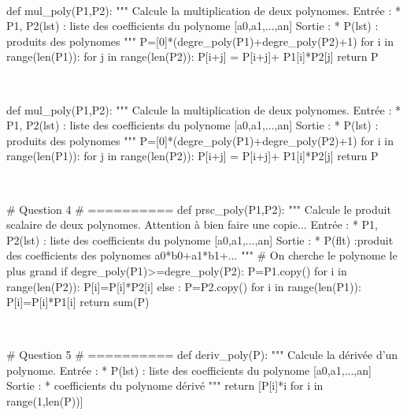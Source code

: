 \documentclass[10pt,fleqn]{article} %
\begin{document}
\begin{multicols}{2}
\newpage

\begin{corrige}
$\quad$
\begin{python}
def mul_poly(P1,P2):
    """
    Calcule la multiplication de deux polynomes.
    Entrée : 
     * P1, P2(lst) : liste des coefficients du 
       polynome [a0,a1,...,an]
    Sortie : 
     * P(lst) : produits des polynomes
    """
    P=[0]*(degre_poly(P1)+degre_poly(P2)+1)
    for i in range(len(P1)):
        for j in range(len(P2)):
           P[i+j] = P[i+j]+ P1[i]*P2[j]
    return P
\end{python}
\end{corrige}

\begin{corrige}
$\quad$
\begin{python}
def mul_poly(P1,P2):
    """
    Calcule la multiplication de deux polynomes.
    Entrée : 
     * P1, P2(lst) : liste des coefficients du 
        polynome [a0,a1,...,an]
    Sortie : 
     * P(lst) : produits des polynomes
    """
    P=[0]*(degre_poly(P1)+degre_poly(P2)+1)
    for i in range(len(P1)):
        for j in range(len(P2)):
           P[i+j] = P[i+j]+ P1[i]*P2[j]
    return P
\end{python}
\end{corrige}



\begin{corrige}
$\quad$
\begin{python}
# Question 4
# ==========
def prsc_poly(P1,P2):
    """
    Calcule le produit scalaire de deux polynomes.
    Attention à bien faire une copie...
    Entrée : 
     * P1, P2(lst) : liste des coefficients du 
       polynome [a0,a1,...,an]
    Sortie : 
     * P(flt) :produit des coefficients des 
        polynomes a0*b0+a1*b1+...
    """
     # On cherche le polynome le plus grand
    if degre_poly(P1)>=degre_poly(P2):
        P=P1.copy()
        for i in range(len(P2)):
            P[i]=P[i]*P2[i]
    else :
        P=P2.copy()
        for i in range(len(P1)):
            P[i]=P[i]*P1[i]
    return sum(P)
\end{python}
\end{corrige}

\begin{corrige}
$\quad$
\begin{python}
# Question 5
# ==========
def deriv_poly(P):
    """
    Calcule la dérivée d'un polynome.
    Entrée : 
     * P(lst) : liste des coefficients du 
        polynome [a0,a1,...,an]
    Sortie : 
     * coefficients du polynome dérivé
    """
    return [P[i]*i for i in range(1,len(P))]
\end{python}
\end{corrige}





\end{multicols}
\end{document}
